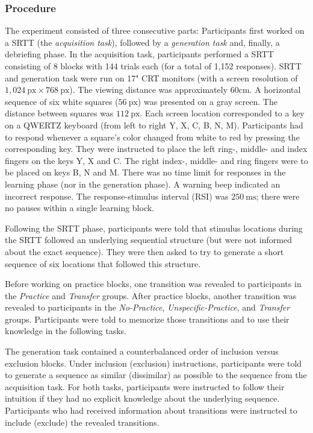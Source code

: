 \documentclass[jou]{apa6}
\theoremstyle{definition}
\theoremstyle{definition}
\theoremstyle{definition}
\theoremstyle{remark}
\begin{document}
\subsubsection{Procedure}\label{procedure}

The experiment consisted of three consecutive parts: Participants first
worked on a SRTT (the \emph{acquisition task}), followed by a
\emph{generation task} and, finally, a debriefing phase. In the
acquisition task, participants performed a SRTT consisting of 8 blocks
with 144 trials each (for a total of 1,152 responses). SRTT and
generation task were run on 17" CRT monitors (with a screen resolution
of \(1{,}024~\text{px} \times 768~\text{px}\)). The viewing distance was
approximately 60cm. A horizontal sequence of six white squares
(\(56~\text{px}\)) was presented on a gray screen. The distance between
squares was \(112~\text{px}\). Each screen location corresponded to a
key on a QWERTZ keyboard (from left to right Y, X, C, B, N, M).
Participants had to respond whenever a square's color changed from white
to red by pressing the corresponding key. They were instructed to place
the left ring-, middle- and index fingers on the keys Y, X and C. The
right index-, middle- and ring fingers were to be placed on keys B, N
and M. There was no time limit for responses in the learning phase (nor
in the generation phase). A warning beep indicated an incorrect
response. The response-stimulus interval (RSI) was \(250~\text{ms}\);
there were no pauses within a single learning block.

Following the SRTT phase, participants were told that stimulus locations
during the SRTT followed an underlying sequential structure (but were
not informed about the exact sequence). They were then asked to try to
generate a short sequence of six locations that followed this structure.

Before working on practice blocks, one transition was revealed to
participants in the \emph{Practice} and \emph{Transfer} groups. After
practice blocks, another transition was revealed to participants in the
\emph{No-Practice}, \emph{Unspecific-Practice}, and \emph{Transfer}
groups. Participants were told to memorize those transitions and to use
their knowledge in the following tasks.

The generation task contained a counterbalanced order of inclusion
versus exclusion blocks. Under inclusion (exclusion) instructions,
participants were told to generate a sequence as similar (dissimilar) as
possible to the sequence from the acquisition task. For both tasks,
participants were instructed to follow their intuition if they had no
explicit knowledge about the underlying sequence. Participants who had
received information about transitions were instructed to include
(exclude) the revealed transitions.
\end{document}
